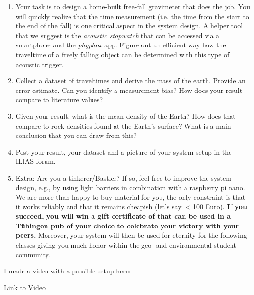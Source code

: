 \documentclass[a4paper,12pt]{article}
\begin{document}
  \begin{enumerate}[label=(\alph*)]
    \item Your task is to design a home-built free-fall gravimeter that does the job. You will quickly realize that the time measurement (i.e. the time from the start to the end of the fall) is one critical aspect in the system design. A helper tool that we suggest is the \textit{acoustic stopwatch} that can be accessed via a smartphone and the \textit{phyphox} app. Figure out an efficient way how the traveltime of a freely falling object can be determined with this type of acoustic trigger.
    
    \item Collect a dataset of traveltimes and derive the mass of the earth. Provide an error estimate. Can you identify a measurement bias? How does your result compare to literature values? 
    
    \item Given your result, what is the mean density of the Earth? How does that compare to rock densities found at the Earth's surface? What is a main conclusion that you can draw from this?

    \item Post your result, your dataset and a picture of your system setup in the ILIAS forum. 

    \item Extra: Are you a tinkerer/Bastler? If so, feel free to improve the system design, e.g., by using light barriers in combination with a raspberry pi nano. We are more than happy to buy material for you, the only constraint is that it works reliably and that it remains cheapish (let's say $<$100 Euro). \textbf{If you succeed, you will win a gift certificate of that can be used in a Tübingen pub of your choice to celebrate your victory with your peers.} Moreover, your system will then be used for eternity for the following classes giving you much honor within the geo- and environmental student community.
  \end{enumerate}
  \begin{tcolorbox}[enhanced jigsaw,breakable,pad at break*=1mm,
    colback=blue!5!white,colframe=babyblueeyes,title=Solutions,
    watermark color=white]
    I made a video with a possible setup here: 
    \begin{center}
        \href{https://www.youtube.com/watch?v=q5SdryMp8iw&feature=youtu.be}{Link to Video} 
    \end{center}

  \end{tcolorbox}
\end{document}
